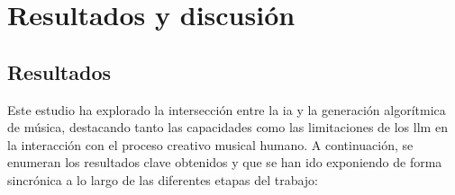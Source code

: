 \chapter{Resultados y discusión}


\section{Resultados}

Este estudio ha explorado la intersección entre la \gls{ia} y la generación algorítmica de música, destacando tanto las capacidades como las limitaciones de los \gls{llm} en la interacción con el proceso creativo musical humano. A continuación, se enumeran los resultados clave obtenidos y que se han ido exponiendo de forma sincrónica a lo largo de las diferentes etapas del trabajo:


